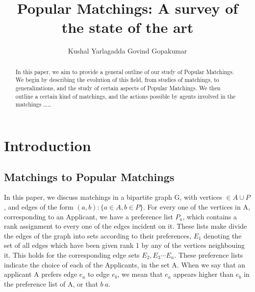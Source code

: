 \documentclass{llncs}
\begin{document}
\title{Popular Matchings: A survey of the state of the art}



\author{Kushal Yarlagadda  Govind Gopakumar}







\maketitle

\begin{abstract}
In this paper, we aim to provide a general outline of our study of Popular Matchings. We begin by describing the evolution of this field, from studies of matchings, to generalizations, and the study of certain aspects of Popular Matchings. We then outline a certain kind of matchings, and the actions possible by agents involved in the matchings \ldots\ldots
\end{abstract}

\section{Introduction}
\subsection{Matchings to Popular Matchings}

In this paper, we discuss  matchings in a bipartite graph G, with vertices $\in A\cup P$, and edges of the form $(a,b):\lbrace a \in A, b \in P\rbrace$. For every one of the vertices in A, corresponding to an Applicant, we have a preference list $P_a$, which contains a rank assignment to every one of the edges incident on it. These lists make divide the edges of the graph into sets according to their preferences, $E_1$ denoting the set of all edges which have been given rank 1 by any of the vertices neighbouing it. This holds for the corresponding edge sets $E_2, E_3 \cdots E_n$. These preference lists indicate the choice of each of the Applicants, in the set A. When we say that an applicant A prefers edge $e_a$ to edge $e_b$, we mean that $e_a$ appears higher than $e_b$  in the preference list of A, or that $b \> a$.  
\end{document}
